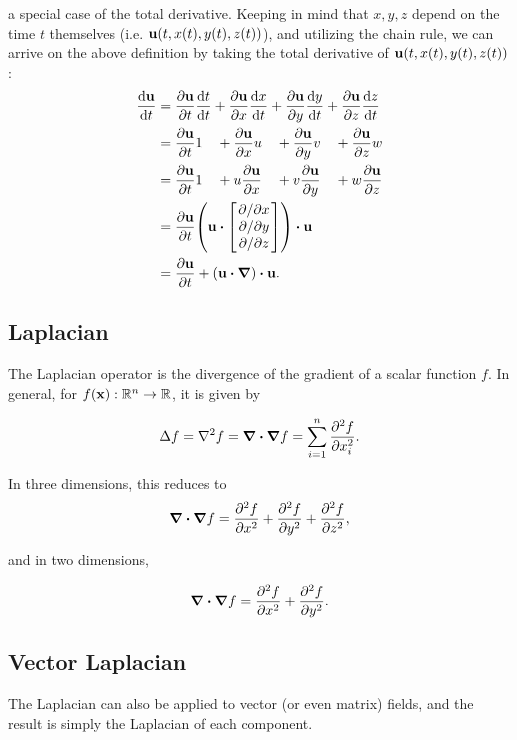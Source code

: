 a special case of the total derivative. Keeping in mind that $x, y, z$ depend on
the time $t$ themselves (i.e. $\vb{u}(t, x(t), y(t), z(t))$), and utilizing the
chain rule, we can arrive on the above definition by taking the total derivative
of $\vb{u}(t, x(t), y(t), z(t))$:
\begin{alignat*}{2}
    \dv{\vb{u}}{t} &= \pdv{\vb{u}}{t}\dv{t}{t} 
                    + \pdv{\vb{u}}{x}\dv{x}{t} 
                    + \pdv{\vb{u}}{y}\dv{y}{t} 
                    + \pdv{\vb{u}}{z}\dv{z}{t} \\
                    &= \pdv{\vb{u}}{t} 1 \quad
                    + \pdv{\vb{u}}{x} u \quad
                    + \pdv{\vb{u}}{y} v \quad
                    + \pdv{\vb{u}}{z} w \\
                    &= \pdv{\vb{u}}{t} 1 \quad
                    + u \pdv{\vb{u}}{x} \quad
                    + v \pdv{\vb{u}}{y} \quad
                    + w \pdv{\vb{u}}{z} \\
                    &= \pdv{\vb{u}}{t}
                    \qty(
                        \vb{u}
                        \vdot
                        \mqty[ \pdv*{x} \\ \pdv*{y} \\ \pdv*{z} ]
                    ) \vdot \vb{u} \\
                    &= \pdv{\vb{u}}{t}
                    + \qty(\vb{u}\vdot\grad)\vdot\vb{u}.
\end{alignat*}

\subsection*{Laplacian}
The Laplacian operator is the divergence of the gradient of a scalar function
$f$. In general, for $f(\vb{x}): \mathbb{R}^n \to \mathbb{R}$, it is given by

$$\Delta f = \laplacian{f} = \grad \vdot \grad f = \sum_{i=1}^n
\pdv[2]{f}{x_i}.$$

In three dimensions, this reduces to 
$$\grad \vdot \grad f = \pdv[2]{f}{x} + \pdv[2]{f}{y} + \pdv[2]{f}{z},$$

and in two dimensions,

$$ \grad \vdot \grad f = \pdv[2]{f}{x} + \pdv[2]{f}{y}.$$

\subsection*{Vector Laplacian}
The Laplacian can also be applied to vector (or even matrix) fields, and the
result is simply the Laplacian of each component.

